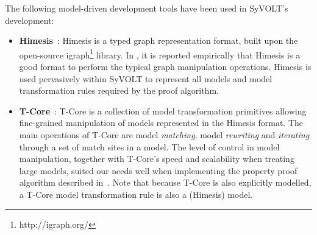 The following model-driven development tools have been used in SyVOLT's
development:
\begin{itemize}


  \item \textbf{Himesis}~\cite{Provost2006}: Himesis is a typed graph representation
  format, built upon the open-source igraph\footnote{http://igraph.org/} library. 
In \cite{Syriani2010b}, it is reported empirically that Himesis is a good format
to perform the typical graph manipulation operations.
  Himesis is used pervasively within SyVOLT to represent all models 
  and model transformation rules required by the proof algorithm.
  
  \item \textbf{T-Core}~\cite{Syriani2010a}: T-Core is a collection of model transformation
  primitives allowing fine-grained manipulation of models represented in the
  Himesis format.
  The main operations of T-Core are model \emph{matching},
  model \emph{rewriting} and \emph{iterating} through a set of match sites in a model.
  The level of control in model manipulation, together with T-Core's speed and
  scalability when treating large models, suited our needs well when
  implementing the property proof algorithm described in~\cite{Lucio2014}. Note that because
  T-Core is also explicitly modelled, a T-Core model transformation rule is also
  a (Himesis) model.


\end{itemize}
